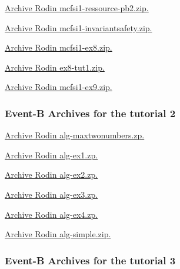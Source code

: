 \documentclass[ 12pt]{article}
\begin{document}
\href{http://mery54.github.io/teaching/mosos/models/mcfsi1-ressource-pb1.zip}{Archive 
  Rodin   mcfsi1-ressource-pb2.zip.}





\href{http://mery54.github.io/teaching/mosos/models/mcfsi1-invariantsafety.zip}{Archive 
  Rodin   mcfsi1-invariantsafety.zip.}



\href{http://mery54.github.io/teaching/mosos/models/mcfsi1-ex8.zip}{Archive 
  Rodin   mcfsi1-ex8.zip.}

\href{http://mery54.github.io/teaching/mosos/models/mcfsi1-ex9.zip}{Archive 
  Rodin   ex8-tut1.zip.}



\href{http://mery54.github.io/teaching/mosos/models/mcfsi1-ex9.zip}{Archive 
  Rodin   mcfsi1-ex9.zip.}



 \subsubsection{Event-B Archives for   the tutorial 2}
\label{sec:event-b-archives}




\href{http://mery54.github.io/teaching/mosos/models/alg-maxtwonumbers.zip}{Archive 
  Rodin  alg-maxtwonumbers.zp.}





\href{http://mery54.github.io/teaching/mosos/models/alg-ex1.zip}{Archive 
  Rodin  alg-ex1.zp.}

\href{http://mery54.github.io/teaching/mosos/models/alg-ex2.zip}{Archive 
  Rodin  alg-ex2.zp.}

\href{http://mery54.github.io/teaching/mosos/models/alg-ex3.zip}{Archive 
  Rodin  alg-ex3.zp.}

\href{http://mery54.github.io/teaching/mosos/models/alg-ex4.zip}{Archive 
  Rodin  alg-ex4.zp.}




\href{http://mery54.github.io/teaching/mosos/models/alg-simple.zip}{Archive 
  Rodin  alg-simple.zip.}





 \subsubsection{Event-B Archives for   the tutorial 3}
\label{sec:event-b-archives}
\end{document}
